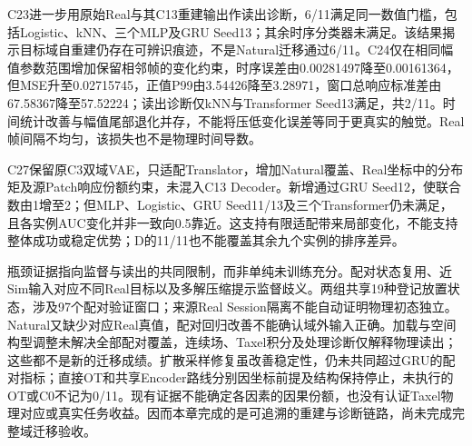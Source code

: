 C23进一步用原始Real与其C13重建输出作读出诊断，6/11满足同一数值门槛，包括Logistic、kNN、三个MLP及GRU Seed13；其余时序分类器未满足。该结果揭示目标域自重建仍存在可辨识痕迹，不是Natural迁移通过6/11。C24仅在相同幅值参数范围增加保留相邻帧的变化约束，时序误差由0.00281497降至0.00161364，但MSE升至0.02715745，正值P99由3.54426降至3.28971，窗口总响应标准差由67.58367降至57.52224；读出诊断仅kNN与Transformer Seed13满足，共2/11。时间统计改善与幅值尾部退化并存，不能将压低变化误差等同于更真实的触觉。Real帧间隔不均匀，该损失也不是物理时间导数。

C27保留原C3双域VAE，只适配Translator，增加Natural覆盖、Real坐标中的分布矩及源Patch响应份额约束，未混入C13 Decoder。新增通过GRU Seed12，使联合数由1增至2；但MLP、Logistic、GRU Seed11/13及三个Transformer仍未满足，且各实例AUC变化并非一致向0.5靠近。这支持有限适配带来局部变化，不能支持整体成功或稳定优势；D的11/11也不能覆盖其余九个实例的排序差异。

瓶颈证据指向监督与读出的共同限制，而非单纯未训练充分。配对状态复用、近Sim输入对应不同Real目标以及多解压缩提示监督歧义。两组共享19种登记放置状态，涉及97个配对验证窗口；来源Real Session隔离不能自动证明物理初态独立。Natural又缺少对应Real真值，配对回归改善不能确认域外输入正确。加载与空间构型调整未解决全部配对覆盖，连续场、Taxel积分及处理诊断仅解释物理读出；这些都不是新的迁移成绩。扩散采样修复虽改善稳定性，仍未共同超过GRU的配对指标；直接OT和共享Encoder路线分别因坐标前提及结构保持停止，未执行的OT或C0不记为0/11。现有证据不能确定各因素的因果份额，也没有认证Taxel物理对应或真实任务收益。因而本章完成的是可追溯的重建与诊断链路，尚未完成完整域迁移验收。
